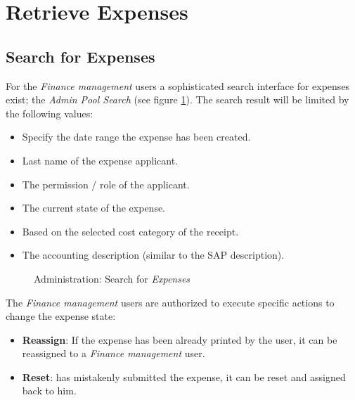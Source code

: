 \section{Retrieve Expenses}
\subsection{Search for Expenses}

For the \textit{Finance management} users a sophisticated search interface for expenses exist; the \textit{Admin Pool Search} (see figure \ref{fig:admin-search}). The search result will be limited by the following values:

\begin{itemize}
    \item Specify the date range the expense has been created.
    \item Last name of the expense applicant.
    \item The permission / role of the applicant.
    \item The current state of the expense.
    \item Based on the selected cost category of the receipt.
    \item The accounting description (similar to the SAP description).
\end{itemize}

\begin{figure}[H]
    \centering
    \caption{Administration: Search for \textit{Expenses}}
    \label{fig:admin-search}
\end{figure}

The \textit{Finance management} users are authorized to execute specific actions to change the expense state:
\begin{itemize}
\item \textbf{Reassign}: If the expense has been already printed by the user, it can be reassigned to a \textit{Finance management} user.
\item \textbf{Reset}: has mistakenly submitted the expense, it can be reset and assigned back to him.
\end{itemize}

